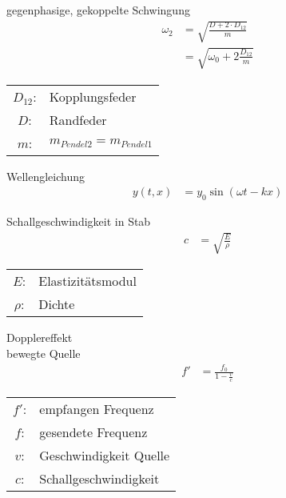 \begin{karte}{gegenphasige, gekoppelte Schwingung}
    \begin{align*}
        \omega_2 &= \sqrt{ \frac{D +2 \cdot D_{12}}{m} } \\
                 &= \sqrt{ \omega_0 + 2 \frac{D_{12}}{m} }
    \end{align*}
    \begin{tabular}[t]{cl}
        \( D_{12}\): & Kopplungsfeder \\
        \( D\): & Randfeder \\
        \( m\): & \( m_{Pendel2} = m_{Pendel1} \)
    \end{tabular}
\end{karte}


\begin{karte}{Wellengleichung}
    \begin{align*}
        y(t,x) &= y_0 \sin (\omega t - k x)
    \end{align*}
\end{karte}

\begin{karte}{Schallgeschwindigkeit in Stab}
    \begin{align*}
        c &= \sqrt{ \frac{E}{\rho} }
    \end{align*}
    \begin{tabular}[t]{cl}
        \( E \): & Elastizitätsmodul \\
        \( \rho \): & Dichte \\
    \end{tabular}
\end{karte}

\begin{karte}{Dopplereffekt\\ bewegte Quelle}
    \begin{align*}
        f' &= \frac{ f_0 }{ 1 - \frac {v}{c} }
    \end{align*}
    \begin{tabular}[t]{cl}
        \( f' \): & empfangen Frequenz \\
        \( f \): & gesendete Frequenz \\
        \( v \): & Geschwindigkeit Quelle\\
        \( c \): & Schallgeschwindigkeit \\
    \end{tabular}
\end{karte}

